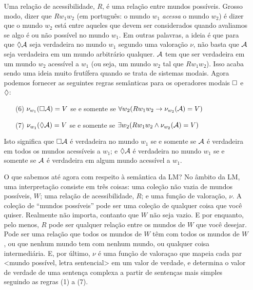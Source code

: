 Uma relação de acessibilidade, $R$, é uma relação entre mundos possíveis. 
Grosso modo, dizer que  $Rw_1w_2$ (em português: o mundo $w_1$ \emph{acessa} o mundo $w_2$) é dizer que o mundo $w_2$ está entre aqueles que devem ser considerados quando avaliamos se algo é ou não possível no mundo $w_1$. Em outras palavras, a ideia é que para que $\Diamond\mathcal{A}$ seja verdadeira no mundo $w_1$ segundo uma valoração $\nu$, não basta que $\mathcal{A}$ seja verdadeira em um mundo arbitrário qualquer. $\mathcal{A}$ tem que ser verdadeira em um mundo $w_2$ acessível a $w_1$ (ou seja, um mundo $w_2$ tal que $Rw_1w_2$).
Isso acaba sendo uma ideia muito frutífera quando se trata de sistemas modais. Agora podemos fornecer as seguintes regras semânticas para os operadores modais $\Box$ e $\Diamond$:

\begin{itemize}
	\item[(6)]$\nu_{w_1}(\Box \mathcal{A})=V$ se e somente se  $\forall w_2 (Rw_1w_2\rightarrow \nu_{w_2}(\mathcal{A})=V)$
	\item[(7)]$\nu_{w_1}(\Diamond \mathcal{A})=V$ se e somente se  $\exists w_2 (Rw_1w_2\wedge \nu_{w_2}(\mathcal{A})=V)$
\end{itemize}
Isto significa que $\Box\mathcal{A}$ é verdadeira no mundo  $w_1$ se e somente se $\mathcal{A}$ é verdadeira em todos os mundos acessíveis a  $w_1$; e $\Diamond\mathcal{A}$ é verdadeira no mundo  $w_1$ se e somente se $\mathcal{A}$ é verdadeira em algum mundo acessível a  $w_1$.

O que sabemos até agora com respeito à semântica da LM?  No âmbito da LM, uma interpretação consiste em três coisas: uma coleção não vazia de mundos possíveis, $W$; uma relação de acessibilidade, $R$; e uma função de valoração, $\nu$. A coleção de ``mundos possíveis'' pode  ser uma coleção de qualquer coisa que você quiser. Realmente não importa, contanto que $W$ não seja vazio. 
E por enquanto, pelo menos, $R$ pode ser qualquer relação entre os mundos de $W$ que você desejar. Pode ser uma relação que todos os mundos de $W$ têm com todos os mundos de $W$, ou que nenhum mundo tem com nenhum mundo, ou qualquer coisa intermediária. 
E, por último, $\nu$ é uma função de valoraçao que mapeia cada par <mundo possível, letra sentencial> em um valor de verdade, e determina o valor de verdade de uma sentença complexa a partir de sentenças mais simples seguindo as regras (1) a (7).

